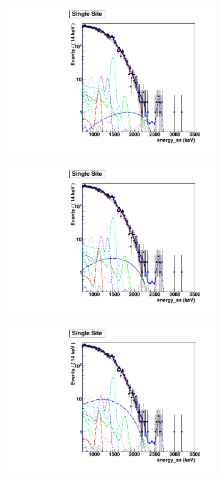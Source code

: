 \documentclass[herrin-thesis.tex]{subfiles}
\begin{document}
\begin{figure}[htp]
\centering
	\begin{subfigure}[c]{0.48\textwidth}
	\centering
	\includegraphics[width=\textwidth]{./plots/analysis_bb0nX1_90_fit_e_ss.pdf}
	\end{subfigure}\hfill%
	\begin{subfigure}[c]{0.48\textwidth}
	\centering
	\includegraphics[width=\textwidth]{./plots/analysis_bb0nX2_90_fit_e_ss.pdf}
	\end{subfigure}
	\begin{subfigure}[c]{0.48\textwidth}
	\centering
	\includegraphics[width=\textwidth]{./plots/analysis_bb0nX3_90_fit_e_ss.pdf}

\end{subfigure}
\end{figure}
\end{document}
